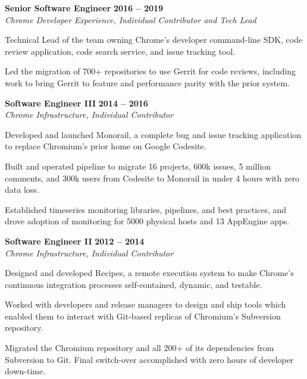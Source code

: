 \documentclass[10pt]{article}
\newenvironment{innerlist}[1][\enskip\textbullet]%
        {\begin{compactitem}[#1]}{\end{compactitem}}
\newcommand{\blankline}{\quad\pagebreak[2]\vspace{-0.3\baselineskip}}
\begin{document}
    \blankline %

    \textbf{Senior Software Engineer}
    \hfill \textbf{2016 -- 2019} \\
    \textit{Chrome Developer Experience, Individual Contributor and Tech Lead}
    \begin{innerlist}
        \item Technical Lead of the team owning Chrome's developer command-line SDK, code review
            application, code search service, and issue tracking tool.
        \item Led the migration of 700+ repositories to use Gerrit for code reviews, including
            work to bring Gerrit to feature and performance parity with the prior system.
    \end{innerlist}
    
    \blankline %

    \textbf{Software Engineer III}
    \hfill \textbf{2014 -- 2016} \\
    \textit{Chrome Infrastructure, Individual Contributor}
    \begin{innerlist}
        \item Developed and launched Monorail, a complete bug and issue tracking application to
            replace Chromium's prior home on Google Codesite.
        \item Built and operated pipeline to migrate 16 projects, 600k issues, 5 million comments,
            and 300k users from Codesite to Monorail in under 4 hours with zero data loss.
        \item Established timeseries monitoring libraries, pipelines, and best practices, and
            drove adoption of monitoring for 5000 physical hosts and 13 AppEngine apps.
    \end{innerlist}
    
    \blankline %

    \textbf{Software Engineer II}
    \hfill \textbf{2012 -- 2014} \\
    \textit{Chrome Infrastructure, Individual Contributor}
    \begin{innerlist}
        \item Designed and developed Recipes, a remote execution system to make Chrome's continuous
            integration processes self-contained, dynamic, and testable.
        \item Worked with developers and release managers to design and ship tools which enabled
            them to interact with Git-based replicas of Chromium's Subversion repository.
        \item Migrated the Chromium repository and all 200+ of its dependencies from Subversion
            to Git. Final switch-over accomplished with zero hours of developer down-time.
    \end{innerlist}
\end{document}
